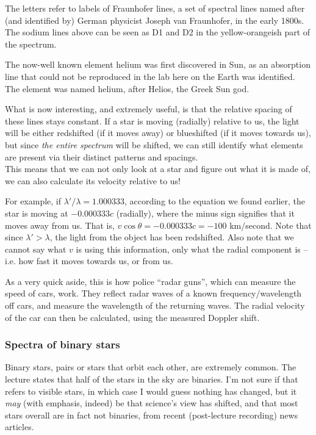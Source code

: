 
The letters refer to labels of Fraunhofer lines, a set of spectral lines named after (and identified by) German physicist Joseph van Fraunhofer, in the early 1800s. The sodium lines above can be seen as D1 and D2 in the yellow-orangeish part of the spectrum.

The now-well known element helium was first discovered in Sun, as an absorption line that could not be reproduced in the lab here on the Earth was identified. The element was named  helium, after Helios, the Greek Sun god.

What is now interesting, and extremely useful, is that the relative spacing of these lines stays constant. If a star is moving (radially) relative to us, the light will be either redshifted (if it moves away) or blueshifted (if it moves towards us), but since \emph{the entire spectrum} will be shifted, we can still identify what elements are present via their distinct patterns and spacings.\\
This means that we can not only look at a star and figure out what it is made of, we can also calculate its velocity relative to us!

For example, if $\lambda'/\lambda = 1.000333$, according to the equation we found earlier, the star is moving at $-0.000333 c$ (radially), where the minus sign signifies that it moves away from us. That is, $v \cos \theta = -0.000333c = -100$ km/second. Note that since $\lambda' > \lambda$, the light from the object has been redshifted. Also note that we cannot say what $v$ is using this information, only what the radial component is -- i.e. how fast it moves towards us, or from us.

As a very quick aside, this is how police ``radar guns'', which can measure the speed of cars, work. They reflect radar waves of a known frequency/wavelength off cars, and measure the wavelength of the returning waves. The radial velocity of the car can then be calculated, using the measured Doppler shift.

\subsubsection{Spectra of binary stars}

Binary stars, pairs or stars that orbit each other, are extremely common. The lecture states that half of the stars in the sky are binaries. I'm not sure if that refers to visible stars, in which case I would guess nothing has changed, but it \emph{may} (with emphasis, indeed) be that science's view has shifted, and that most stars overall are in fact not binaries, from recent (post-lecture recording) news articles.

